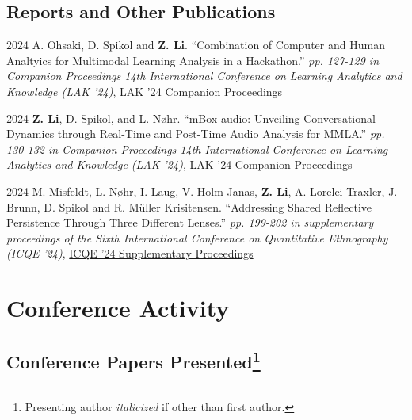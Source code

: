 \documentclass[11pt,letterpaper]{report}
\begin{document}
    \subsection*{Reports and Other Publications}

    \begin{tablist}
        \item[2024] \tab{} A. Ohsaki, D. Spikol and \textbf{Z. Li}. \enquote{Combination of Computer and Human Analtyics for Multimodal Learning Analysis in a Hackathon.} \textit{pp. 127-129 in Companion Proceedings 14th International Conference on Learning Analytics and Knowledge (LAK '24)}, \href{https://www.solaresearch.org/wp-content/uploads/2024/03/LAK24_CompanionProceedings.pdf}{LAK '24 Companion Proceedings}
        \item[2024] \tab{} \textbf{Z. Li}, D. Spikol, and L. Nøhr. \enquote{mBox-audio: Unveiling Conversational Dynamics through Real-Time and Post-Time Audio Analysis for MMLA.} \textit{pp. 130-132 in Companion Proceedings 14th International Conference on Learning Analytics and Knowledge (LAK '24)}, \href{https://www.solaresearch.org/wp-content/uploads/2024/03/LAK24_CompanionProceedings.pdf}{LAK '24 Companion Proceedings}
        \item[2024] \tab{} M. Misfeldt, L. Nøhr, I. Laug, V. Holm-Janas, \textbf{Z. Li}, A. Lorelei Traxler, J. Brunn, D. Spikol and R. Müller Krisitensen. \enquote{Addressing Shared Reflective Persistence Through Three Different Lenses.} \textit{pp. 199-202 in supplementary proceedings of the Sixth International Conference on Quantitative Ethnography (ICQE '24)}, \href{https://www.qesoc.org/images/pdf/ICQE24_Supplement_Proceedings.pdf}{ICQE '24 Supplementary Proceedings}
    \end{tablist}


    \section*{Conference Activity}

    \subsection*{Conference Papers Presented\footnote{Presenting author \textit{italicized} if other than first author.}}
\end{document}
